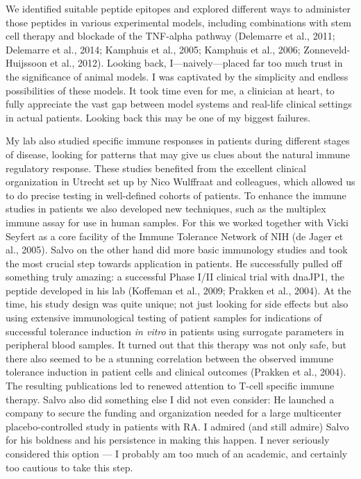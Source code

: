 \documentclass[authordate, editorial]{jote-new-article}
\begin{document}
	We identified suitable peptide epitopes and explored different ways to administer those peptides in various experimental models, including combinations with stem cell therapy and blockade of the TNF-alpha pathway (Delemarre et al., 2011; Delemarre et al., 2014; Kamphuis et al., 2005; Kamphuis et al., 2006; Zonneveld-Huijssoon et al., 2012). Looking back, I—naively—placed far too much trust in the significance of animal models. I was captivated by the simplicity and endless possibilities of these models. It took time even for me, a clinician at heart, to fully appreciate the vast gap between model systems and real-life clinical settings in actual patients. Looking back this may be one of my biggest failures.







	My lab also studied specific immune responses in patients during different stages of disease, looking for patterns that may give us clues about the natural immune regulatory response. These studies benefited from the excellent clinical organization in Utrecht set up by Nico Wulffraat and colleagues, which allowed us to do precise testing in well-defined cohorts of patients. To enhance the immune studies in patients we also developed new techniques, such as the multiplex immune assay for use in human samples. For this we worked together with Vicki Seyfert as a core facility of the Immune Tolerance Network of NIH (de Jager et al., 2005). Salvo on the other hand did more basic immunology studies and took the most crucial step towards application in patients. He successfully pulled off something truly amazing: a successful Phase I/II clinical trial with dnaJP1, the peptide developed in his lab (Koffeman et al., 2009; Prakken et al., 2004). At the time, his study design was quite unique; not just looking for side effects but also using extensive immunological testing of patient samples for indications of successful tolerance induction \emph{in vitro} in patients using surrogate parameters in peripheral blood samples. It turned out that this therapy was not only safe, but there also seemed to be a stunning correlation between the observed immune tolerance induction in patient cells and clinical outcomes (Prakken et al., 2004). The resulting publications led to renewed attention to T-cell specific immune therapy. Salvo also did something else I did not even consider: He launched a company to secure the funding and organization needed for a large multicenter placebo-controlled study in patients with RA. I admired (and still admire) Salvo for his boldness and his persistence in making this happen. I never seriously considered this option — I probably am too much of an academic, and certainly too cautious to take this step.
\end{document}
